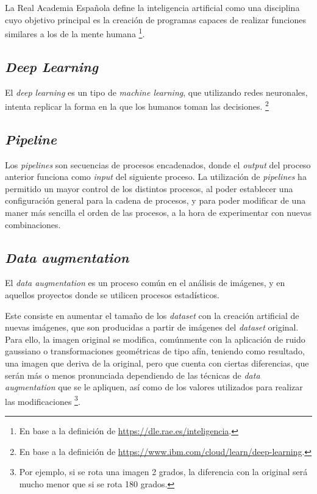 La Real Academia Española define la inteligencia artificial como una disciplina cuyo objetivo principal es la creación de programas capaces de realizar funciones similares a los de la mente humana \footnote{En base a la definición de \url{https://dle.rae.es/inteligencia}.}.

\subsection{\textit{Deep Learning}}

El \textit{deep learning} es un tipo de \textit{machine learning}, que utilizando redes neuronales, intenta replicar la forma en la que los humanos toman las decisiones. \footnote{En base a la definición de \url{https://www.ibm.com/cloud/learn/deep-learning}.}

\subsection{\textit{Pipeline}}

Los \textit{pipelines} son secuencias de procesos encadenados, donde el \textit{output} del proceso anterior funciona como \textit{input} del siguiente proceso. La utilización de \textit{pipelines} ha permitido un mayor control de los distintos procesos, al poder 
establecer una configuración general para la cadena de procesos, y para poder modificar de una maner más sencilla el orden de las procesos, a la hora de experimentar con nuevas combinaciones.

\subsection{\textit{Data augmentation}}\label{dataaugmentation}

El \textit{data augmentation} es un proceso común en el análisis de imágenes, y en aquellos proyectos donde se utilicen procesos estadísticos. 

Este consiste en aumentar el tamaño de los \textit{dataset} con la creación artificial de nuevas imágenes, que son producidas a partir de imágenes del \textit{dataset} original.
Para ello, la imagen original se modifica, comúnmente con la aplicación de ruido gaussiano o transformaciones geométricas de tipo afín, teniendo como resultado, una imagen que deriva de la original, pero que cuenta con ciertas diferencias, que serán más o menos pronunciada dependiendo de las técnicas 
de \textit{data augmentation} que se le apliquen, así como de los valores utilizados para realizar las modificaciones \footnote{Por ejemplo, si se rota una imagen 2 grados, la diferencia con la original será mucho menor que si se rota 180 grados.}.	

